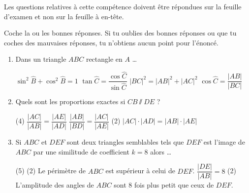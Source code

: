 \documentclass[../partie2.tex]{subfiles}
\begin{document}
\begin{consigne}
    Les questions relatives à cette compétence doivent être répondues sur la feuille d'examen et non sur la feuille à en-tête.
\end{consigne}
\begin{exercise}[points=3]
    Coche la ou les bonnes réponses. Si tu oublies des bonnes réponses ou que tu coches des mauvaises réponses, tu n'obtiens aucun point pour l'énoncé.
    \begin{enumerate}
        \item Dans un triangle $ABC$ rectangle en $A$ \dots
              \begin{QCM}
                  \choice $\sin^2\widehat{B} + \cos^2\widehat{B}=1$
                  \choice $\tan\widehat{C} = \dfrac{\cos\widehat{C}}{\sin\widehat{C}}$
                  \choice $|BC|^2 = |AB|^2 + |AC|^2$
                  \choice $\cos\widehat{C}=\dfrac{|AB|}{|BC|}$
              \end{QCM}
        \item Quels sont les proportions exactes si $CB\sslash DE$ ? 
              \begin{QCM}(4)
                  \choice $\dfrac{|AC|}{|AB|}=\dfrac{|AE|}{|AD|}$
                  \choice $\dfrac{|AB|}{|BD|}=\dfrac{|AC|}{|AE|}$
                  \choice*(2) $|AC|\cdot |AD| = |AB| \cdot |AE|$
              \end{QCM}
        \item Si $ABC$ et $DEF$ sont deux triangles semblables tels que $DEF$ est l'image de $ABC$ par une similitude de coefficient $k=8$ alors \dots
              \begin{QCM}(5)
                  \choice*(2) Le périmètre de $ABC$ est supérieur à celui de $DEF$.
                  \choice $\dfrac{|DE|}{|AB|}=8$
                  \choice*(2) L'amplitude des angles de $ABC$ sont 8 fois plus petit que ceux de $DEF$.

\end{QCM}
\end{enumerate}
\end{exercise}
\end{document}
